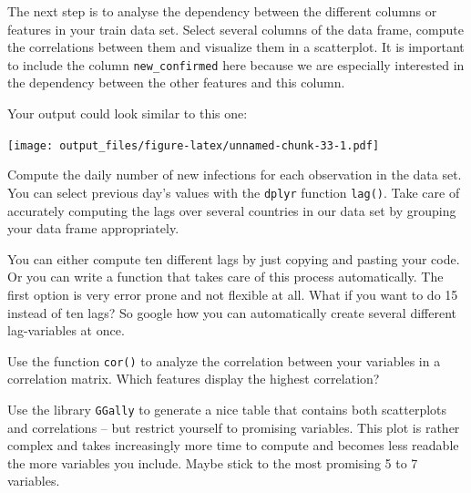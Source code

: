 \documentclass[
  11pt,
]{article}
\newenvironment{tips}[1]
  {
  \begin{itemize}
  \footnotesize
  \renewcommand{\labelitemi}{
    \raisebox{-.7\height}[0pt][0pt]{
      {\setkeys{Gin}{width=3em,keepaspectratio}
        \texttt{[image: images/\#1.png]}}
    }
  }
  \setlength{\fboxsep}{1em}
  \begin{rbox}
  \item
  }
  {
  \end{rbox}
  \end{itemize}
  }
\begin{document}
The next step is to analyse the dependency between the different columns or features in your train data set. Select several columns of the data frame, compute the correlations between them and visualize them in a scatterplot. It is important to include the column \texttt{new\_confirmed} here because we are especially interested in the dependency between the other features and this column.

Your output could look similar to this one:

\texttt{[image: output\_files/figure-latex/unnamed-chunk-33-1.pdf]}

\begin{tips}r

Compute the daily number of new infections for each observation in the data set. You can select previous day's values with the \texttt{dplyr} function \texttt{lag()}. Take care of accurately computing the lags over several countries in our data set by grouping your data frame appropriately.

You can either compute ten different lags by just copying and pasting your code. Or you can write a function that takes care of this process automatically. The first option is very error prone and not flexible at all. What if you want to do 15 instead of ten lags? So google how you can automatically create several different lag-variables at once.

Use the function \texttt{cor()} to analyze the correlation between your variables in a correlation matrix. Which features display the highest correlation?

Use the library \texttt{GGally} to generate a nice table that contains both scatterplots and correlations -- but restrict yourself to promising variables. This plot is rather complex and takes increasingly more time to compute and becomes less readable the more variables you include. Maybe stick to the most promising 5 to 7 variables.

\end{tips}
\end{document}
